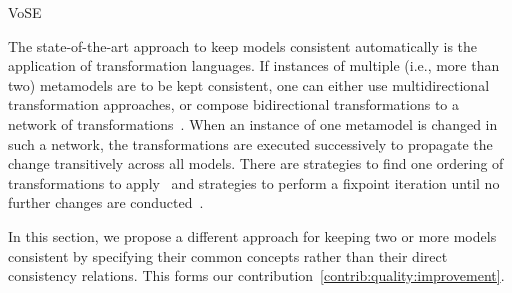 \begin{copiedFrom}{VoSE}

The state-of-the-art approach to keep models consistent automatically is the application of transformation languages.
If instances of multiple (i.e., more than two) metamodels are to be kept consistent, one can either use multidirectional transformation approaches, or compose bidirectional transformations to a network of transformations~\cite{cleve2019dagstuhl}.
When an instance of one metamodel is changed in such a network, the transformations are executed successively to propagate the change transitively across all models.
There are strategies to find one ordering of transformations to apply~\cite{stevens2020BidirectionalTransformationLarge-SoSym} and strategies to perform a fixpoint iteration until no further changes are conducted~\cite{klare2019icmt}.

In this section, we propose a different approach for keeping two or more models consistent by specifying their common concepts rather than their direct consistency relations.
This forms our contribution~\autoref{contrib:quality:improvement}.







\end{copiedFrom}
